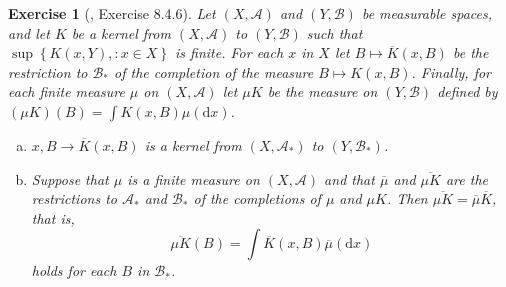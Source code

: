 \documentclass[11pt]{article}
\theoremstyle{plain}
\newtheorem{exercise}{Exercise}
\theoremstyle{definition}
\theoremstyle{remark}
\begin{document}
\begin{exercise}[\cite{book:992991}, Exercise 8.4.6]
    Let $(X,\mathscr A)$ and $(Y, \mathscr B)$ be measurable spaces, and let $K$ be a kernel from $(X,\mathscr A)$ to $(Y,\mathscr B)$ such that $\sup \left\{ K(x,Y), : x \in X \right\}$ is finite.
    For each $x$ in $X$ let $B\mapsto \overline K (x, B)$ be the restriction to $\mathscr B_*$ of the completion of the measure $B \mapsto K (x, B)$.
    Finally, for each finite measure $\mu$ on $(X, \mathscr A)$ let $\mu K$ be the measure on $(Y, \mathscr B)$ defined by $(\mu K) (B) = \int K (x,B) \mu (\mathrm d x)$.
    \begin{enumerate}[(a)]
        \item 
            $x,B \to \overline K (x,B)$ is a kernel from $(X, \mathscr A_*)$ to $(Y, \mathscr B_*)$.
        \item
            Suppose that $\mu$ is a finite measure on $(X, \mathscr A)$ and that $\overline \mu$ and $\overline{\mu K}$ are the restrictions to $\mathscr A_*$ and $\mathscr B_*$ of the completions of $\mu$ and $\mu K$.
            Then $\overline{\mu K} = \overline \mu \overline K$, that is,
            \begin{equation*}
                \overline{\mu K} (B) = \int \overline K (x, B) \overline \mu (\mathrm d x)
            \end{equation*}
            holds for each $B$ in $\mathscr B_*$.
    \end{enumerate}

\end{exercise}
\end{document}
